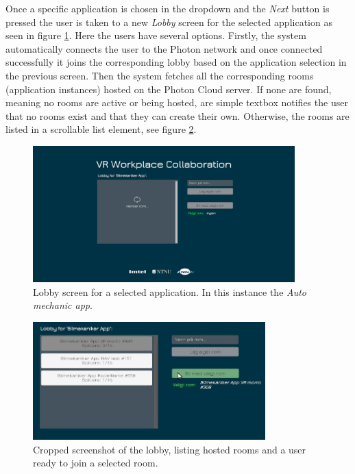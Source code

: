 Once a specific application is chosen in the dropdown and the \textit{Next} button is pressed the user is taken to a new \textit{Lobby} screen for the selected application as seen in figure \ref{fig:phase3_LobbyScene1}. Here the users have several options. Firstly, the system automatically connects the user to the Photon network and once connected successfully it joins the corresponding lobby based on the application selection in the previous screen.    
Then the system fetches all the corresponding rooms (application instances) hosted on the Photon Cloud server. If none are found, meaning no rooms are active or being hosted, are simple textbox notifies the user that no rooms exist and that they can create their own. Otherwise, the rooms are listed in a scrollable list element, see figure \ref{fig:phase3_LobbyMultiRoomsSelectSmall}. 

\begin{figure}[H]
  \centering
   \captionsetup{width=.9\linewidth}
    \includegraphics[width=0.9\textwidth]{fig/phase_3/implementation/Lobby2Fetching.PNG}
 \caption{Lobby screen for a selected application. In this instance the \textit{Auto mechanic app}.}
\label{fig:phase3_LobbyScene1}
\end{figure}

\begin{figure}[H]
  \centering
   \captionsetup{width=.8\linewidth}
    \includegraphics[width=0.8\textwidth]{fig/phase_3/implementation/Lobby2MultiRoomsSelectedSmall.jpg}
 \caption{Cropped screenshot of the lobby, listing hosted rooms and a user ready to join a selected room.}
\label{fig:phase3_LobbyMultiRoomsSelectSmall}
\end{figure}

